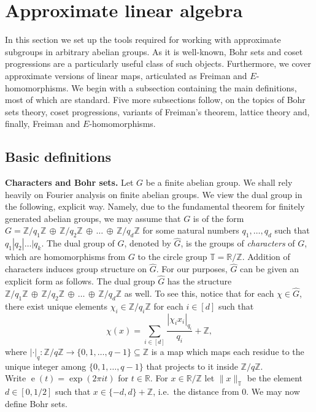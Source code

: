 \documentclass[a4paper,11pt]{article}
\numberwithin{theorem}{section}
\theoremstyle{definition}
\newcommand{\on}[1]{
	\operatorname{#1}
}
\newcommand{\tn}[1]{ %
	\|#1\|_{\mathbb{T}}
}
\begin{document}
\section{Approximate linear algebra}\label{sectiontools}

In this section we set up the tools required for working with approximate subgroups in arbitrary abelian groups. As it is well-known, Bohr sets and coset progressions are a particularly useful class of such objects. Furthermore, we cover approximate versions of linear maps, articulated as Freiman and $E$-homomorphisms. We begin with a subsection containing the main definitions, most of which are standard. Five more subsections follow, on the topics of Bohr sets theory, coset progressions, variants of Freiman's theorem, lattice theory and, finally, Freiman and $E$-homomorphisms.

\subsection{Basic definitions}

\noindent\textbf{Characters and Bohr sets.} Let $G$ be a finite abelian group. We shall rely heavily on Fourier analysis on finite abelian groups. We view the dual group in the following, explicit way. Namely, due to the fundamental theorem for finitely generated abelian groups, we may assume that $G$ is of the form $G = \mathbb{Z}/q_1 \mathbb{Z}\, \oplus\, \mathbb{Z}/q_2 \mathbb{Z} \,\oplus\, \dots \,\oplus\,\mathbb{Z}/q_d \mathbb{Z}$ for some natural numbers $q_1, \dots, q_d$ such that $q_1 | q_2 | \dots | q_k$. The dual group of $G$, denoted by $\hat{G}$, is the groups of \textit{characters} of $G$, which are homomorphisms from $G$ to the circle group $\mathbb{T} = \mathbb{R}/\mathbb{Z}$. Addition of characters induces group structure on $\hat{G}$. For our purposes, $\hat{G}$ can be given an explicit form as follows. The dual group $\hat{G}$ has the structure $\mathbb{Z}/q_1 \mathbb{Z}\, \oplus\, \mathbb{Z}/q_2 \mathbb{Z} \,\oplus\, \dots \,\oplus\,\mathbb{Z}/q_d \mathbb{Z}$ as well. To see this, notice that for each $\chi \in \hat{G}$, there exist unique elements $\chi_i \in \mathbb{Z}/q_i\mathbb{Z}$ for each $i \in [d]$ such that 
\[\chi(x) = \sum_{i \in [d]} \frac{|\chi_i x_i|_{q_i}}{q_i} + \mathbb{Z},\]
where $|\cdot|_q \colon \mathbb{Z}/ q\mathbb{Z} \to \{0, 1, \dots, q-1\} \subseteq \mathbb{Z}$ is a map which maps each residue to the unique integer among $\{0,1, \dots, q-1\}$ that projects to it inside $\mathbb{Z}/ q\mathbb{Z}$.\\
\indent Write $\on{e}(t) = \exp(2 \pi i t)$ for $t \in \mathbb{R}$. For $x \in \mathbb{R}/\mathbb{Z}$ let $\tn{x}$ be the element $d \in [0, 1/2]$ such that $x \in \{-d,d\} + \mathbb{Z}$, i.e.\ the distance from 0. We may now define Bohr sets.
\end{document}
